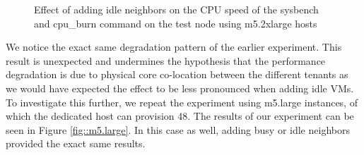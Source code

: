 \begin{figure}[H]
\centering
{}
\caption{Effect of adding idle neighbors on the CPU speed of the sysbench and cpu\_burn command on the test node using m5.2xlarge hosts} 
\label{fig::m5.2xlarge_idle}
\end{figure}
\noindent
We notice the exact same degradation pattern of the earlier experiment. This result is unexpected
and undermines the hypothesis that the performance degradation is due to physical core co-location between the different 
tenants as we would have expected the effect to be less pronounced when adding idle VMs. \\
To investigate this further, we repeat the experiment using m5.large instances, of which the dedicated host can 
provision 48. The results of our experiment can be seen in Figure \ref{fig::m5.large}. In this 
case as well, adding busy or idle neighbors provided the exact same results.  

